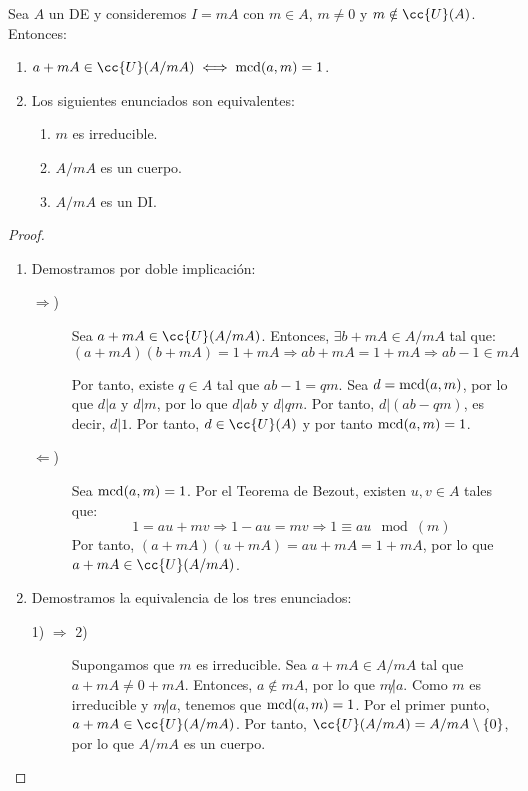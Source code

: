 \begin{teo}
    \label{teoEquivAnilloCociente}
    Sea $A$ un DE y consideremos $I = mA$ con $m \in A$, $m \neq 0$ y $m \notin \cc{U}(A)$. Entonces:
    \begin{enumerate}
        \item $a + mA \in \cc{U}(A/mA) \iff \mcd(a,m) = 1$.
        \item Los siguientes enunciados son equivalentes:
        \begin{enumerate}[label=\arabic*)]
            \item $m$ es irreducible.
            \item $A/mA$ es un cuerpo.
            \item $A/mA$ es un DI.
        \end{enumerate}
    \end{enumerate}
\begin{proof} \
    \begin{enumerate}
        \item Demostramos por doble implicación:
        \begin{description}
            \item[$\Longrightarrow$)] Sea $a + mA \in \cc{U}(A/mA)$. Entonces, $\exists b + mA \in A/mA$ tal que:
            $$(a + mA)(b + mA) = 1 + mA \Longrightarrow ab + mA = 1 + mA \Longrightarrow ab - 1 \in mA$$

            Por tanto, existe $q \in A$ tal que $ab - 1 = qm$. Sea $d = \operatorname{mcd}(a,m)$, por lo que $d|a$ y $d|m$, por lo que $d|ab$ y $d|qm$. Por tanto, $d|(ab - qm)$, es decir, $d|1$. Por tanto, $d \in \cc{U}(A)$ y por tanto $\operatorname{mcd}(a,m) = 1$.
            \item[$\Longleftarrow$)] Sea $\operatorname{mcd}(a,m) = 1$. Por el Teorema de Bezout, existen $u,v \in A$ tales que:
            $$1 = au + mv \Longrightarrow 1 - au = mv \Longrightarrow 1 \equiv au \mod(m)$$
            Por tanto, $(a + mA)(u + mA) = au + mA = 1 + mA$, por lo que $a + mA \in \cc{U}(A/mA)$.
        \end{description}

        \item Demostramos la equivalencia de los tres enunciados:
        \begin{description}
            \item[1) $\Longrightarrow$ 2)] Supongamos que $m$ es irreducible. Sea $a + mA \in A/mA$ tal que $a + mA \neq 0 + mA$. Entonces, $a \notin mA$, por lo que $m \not| a$. Como $m$ es irreducible y $m \not| a$, tenemos que $\operatorname{mcd}(a,m) = 1$. Por el primer punto, $a + mA \in \cc{U}(A/mA)$. Por tanto, $\cc{U}(A/mA) = A/mA \setminus \{0\}$, por lo que $A/mA$ es un cuerpo.
            

\end{description}
\end{enumerate}
\end{proof}
\end{teo}
